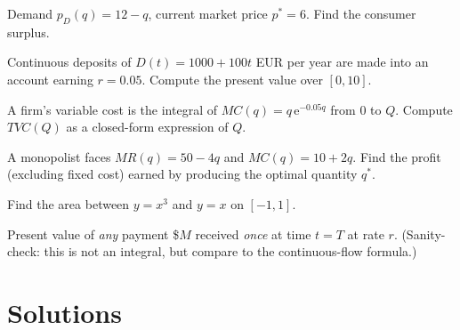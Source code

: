 \begin{problems}
  \item Demand $p_D(q)=12-q$, current market price $p^{*}=6$. Find the
        consumer surplus.
  \item Continuous deposits of $D(t)=1000+100t$ EUR per year are made
        into an account earning $r=0.05$. Compute the present value
        over $[0,10]$.
  \item A firm's variable cost is the integral of $MC(q)=q\,\mathrm{e}^{-0.05q}$
        from $0$ to $Q$. Compute $TVC(Q)$ as a closed-form expression of
        $Q$.
  \item A monopolist faces $MR(q)=50-4q$ and $MC(q)=10+2q$. Find the
        profit (excluding fixed cost) earned by producing the optimal
        quantity $q^{*}$.
  \item Find the area between $y=x^{3}$ and $y=x$ on $[-1,1]$.
  \item Present value of \emph{any} payment \$$M$ received \emph{once}
        at time $t=T$ at rate $r$. (Sanity-check: this is not an
        integral, but compare to the continuous-flow formula.)
\end{problems}

\section{Solutions}

